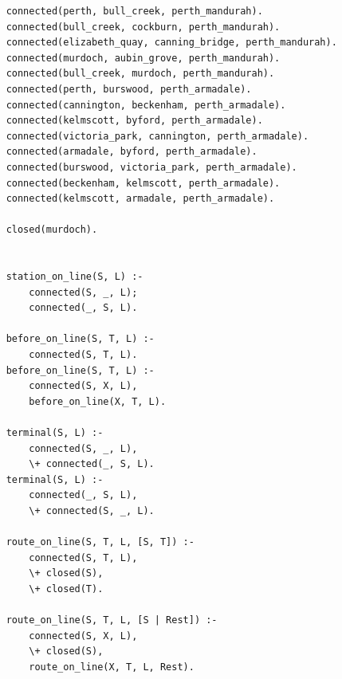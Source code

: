 \documentclass[12pt,a4paper]{article}
\begin{document}
\begin{lstlisting}
    connected(perth, bull_creek, perth_mandurah).
    connected(bull_creek, cockburn, perth_mandurah).
    connected(elizabeth_quay, canning_bridge, perth_mandurah).
    connected(murdoch, aubin_grove, perth_mandurah).
    connected(bull_creek, murdoch, perth_mandurah).
    connected(perth, burswood, perth_armadale).
    connected(cannington, beckenham, perth_armadale).
    connected(kelmscott, byford, perth_armadale).
    connected(victoria_park, cannington, perth_armadale).
    connected(armadale, byford, perth_armadale).
    connected(burswood, victoria_park, perth_armadale).
    connected(beckenham, kelmscott, perth_armadale).
    connected(kelmscott, armadale, perth_armadale).

    closed(murdoch).


    station_on_line(S, L) :- 
        connected(S, _, L); 
        connected(_, S, L).

    before_on_line(S, T, L) :-
        connected(S, T, L).
    before_on_line(S, T, L) :-
        connected(S, X, L),
        before_on_line(X, T, L).

    terminal(S, L) :-
        connected(S, _, L), 
        \+ connected(_, S, L).
    terminal(S, L) :-
        connected(_, S, L),
        \+ connected(S, _, L).

    route_on_line(S, T, L, [S, T]) :-
        connected(S, T, L),
        \+ closed(S),
        \+ closed(T).

    route_on_line(S, T, L, [S | Rest]) :-
        connected(S, X, L),
        \+ closed(S),
        route_on_line(X, T, L, Rest).
\end{lstlisting}
\end{document}
